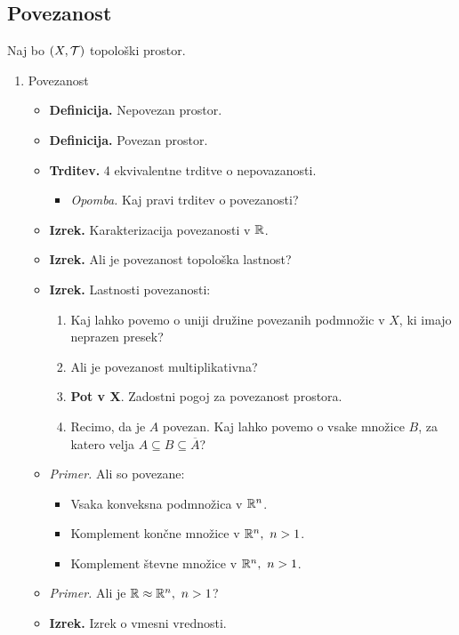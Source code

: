 \subsection{Povezanost}
Naj bo $(X, \mathcal{T})$ topološki prostor.
\begin{enumerate}
    \item Povezanost
    \begin{itemize}
        \item \colorbox{purple!30}{\textbf{Definicija.}} Nepovezan prostor.
        \item \colorbox{purple!30}{\textbf{Definicija.}} Povezan prostor.
        \item \colorbox{blue!30}{\textbf{Trditev.}} 4 ekvivalentne trditve o nepovazanosti.
        \begin{itemize}
            \item \colorbox{yellow!30}{\emph{Opomba.}} Kaj pravi trditev o povezanosti?
        \end{itemize}
        \item \colorbox{blue!30}{\textbf{Izrek.}} Karakterizacija povezanosti v $\mathbb{R}$.        
        \item \colorbox{blue!30}{\textbf{Izrek.}} Ali je povezanost topološka lastnost?
        \item \colorbox{blue!30}{\textbf{Izrek.}} Lastnosti povezanosti:
        \begin{enumerate}
            \item Kaj lahko povemo o uniji družine povezanih podmnožic v $X$, ki imajo neprazen presek?
            \item Ali je povezanost multiplikativna?
            \item \textbf{Pot v X}. Zadostni pogoj za povezanost prostora.
            \item Recimo, da je $A$ povezan. Kaj lahko povemo o vsake množice $B$, za katero velja $A \subseteq B \subseteq \overline{A}$?
        \end{enumerate}
        \item \colorbox{yellow!30}{\emph{Primer.}} Ali so povezane:
        \begin{itemize}
            \item Vsaka konveksna podmnožica v $\mathbb{R}^n$.
            \item Komplement končne množice v $\mathbb{R}^n, \ n > 1$.
            \item Komplement števne množice v $\mathbb{R}^n, \ n > 1$.
        \end{itemize}
        \item \colorbox{yellow!30}{\emph{Primer.}} Ali je $\mathbb{R} \approx \mathbb{R}^n, \ n > 1$?
        \item \colorbox{blue!30}{\textbf{Izrek.}} Izrek o vmesni vrednosti.
    \end{itemize}
    

\end{enumerate}
